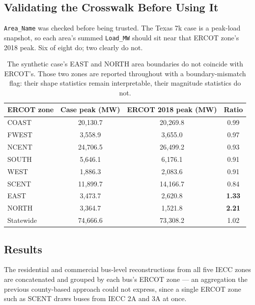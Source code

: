 \documentclass[11pt]{article}
\begin{document}
\subsection{Validating the Crosswalk Before Using It}

\texttt{Area\_Name} was checked before being trusted. The Texas 7k case is a peak-load
snapshot, so each area's summed \texttt{Load\_MW} should sit near that ERCOT zone's 2018
peak. Six of eight do; two clearly do not.

\begin{table}[H]
\centering
\small
\begin{tabular}{lccc}
\toprule
ERCOT zone & Case peak (MW) & ERCOT 2018 peak (MW) & Ratio \\
\midrule
COAST & 20{,}130.7 & 20{,}269.8 & 0.99 \\
FWEST & 3{,}558.9 & 3{,}655.0 & 0.97 \\
NCENT & 24{,}706.5 & 26{,}499.2 & 0.93 \\
SOUTH & 5{,}646.1 & 6{,}176.1 & 0.91 \\
WEST & 1{,}886.3 & 2{,}083.6 & 0.91 \\
SCENT & 11{,}899.7 & 14{,}166.7 & 0.84 \\
\midrule
EAST & 3{,}473.7 & 2{,}620.8 & \textbf{1.33} \\
NORTH & 3{,}364.7 & 1{,}521.8 & \textbf{2.21} \\
\midrule
Statewide & 74{,}666.6 & 73{,}308.2 & 1.02 \\
\bottomrule
\end{tabular}
\caption{The synthetic case's EAST and NORTH area boundaries do not coincide with
ERCOT's. Those two zones are reported throughout with a boundary-mismatch flag: their
shape statistics remain interpretable, their magnitude statistics do not.}
\label{tab:areacheck}
\end{table}

\subsection{Results}

The residential and commercial bus-level reconstructions from all five IECC zones are
concatenated and grouped by each bus's ERCOT zone --- an aggregation the previous
county-based approach could not express, since a single ERCOT zone such as SCENT draws
buses from IECC 2A and 3A at once.
\end{document}
